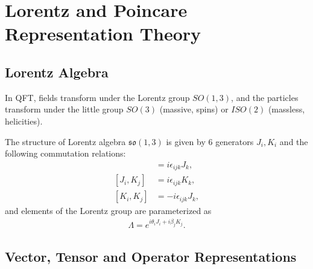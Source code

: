 
\section{Lorentz and Poincare Representation Theory}
\label{sec:representation-theory}



\subsection{Lorentz Algebra}
\label{subsec:lorentz-algebra}

In QFT, fields transform under the Lorentz group $SO(1,3)$, and the particles transform under the little group $SO(3)$ (massive, spins) or $ISO(2)$ (massless, helicities).

The structure of Lorentz algebra $\mathfrak{so}(1,3)$ is given by $6$ generators $J_i, K_i$ and the following commutation relations:
\begin{align*}
    [J_i, J_j] &= i \epsilon_{ijk} J_k, \\
    [J_i, K_j] &= i \epsilon_{ijk} K_k, \\
    [K_i, K_j] &= -i \epsilon_{ijk} J_k,
\end{align*}
and elements of the Lorentz group are parameterized as
\begin{align}
    \Lambda = e^{i \theta_i J_i + i \beta_j K_j}.
\end{align}

\subsection{Vector, Tensor and Operator Representations}
\label{subsec:vector-tensor-and-operator-representations}

